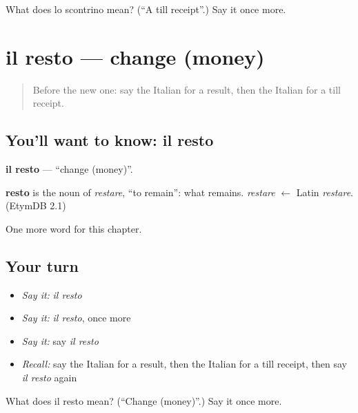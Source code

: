 \begin{tcolorbox}[breakable,colback=teal!4,colframe=teal!35!black,title={Before you move on}]
What does lo scontrino mean? (\textquotedblleft{}A till receipt\textquotedblright{}.) Say it once more.
\end{tcolorbox}
\section[il resto]{il resto — change (money)}

\label{lesson:IT-C226-resto}



\begin{quote}
Before the new one: say the Italian for a result, then the Italian for a till receipt.
\end{quote}

\subsection*{You'll want to know: il resto}
\textbf{il resto} — \textquotedblleft{}change (money)\textquotedblright{}.

\begin{cousinweb}
\textbf{resto} is the noun of \emph{restare}, \textquotedblleft{}to remain\textquotedblright{}: what remains. \emph{restare} $\leftarrow$ Latin \emph{restare}. (EtymDB 2.1)
\end{cousinweb}

\begin{grammarlens}[title={What you've built}]
One more word for this chapter.
\end{grammarlens}

\subsection*{Your turn}
\begin{itemize}
\raggedright
  \item \emph{Say it:} \emph{il resto}
  \item \emph{Say it:} \emph{il resto}, once more
  \item \emph{Say it:} say \emph{il resto}
  \item \emph{Recall:} say the Italian for a result, then the Italian for a till receipt, then say \emph{il resto} again
\end{itemize}

\begin{tcolorbox}[breakable,colback=teal!4,colframe=teal!35!black,title={Before you move on}]
What does il resto mean? (\textquotedblleft{}Change (money)\textquotedblright{}.) Say it once more.
\end{tcolorbox}
